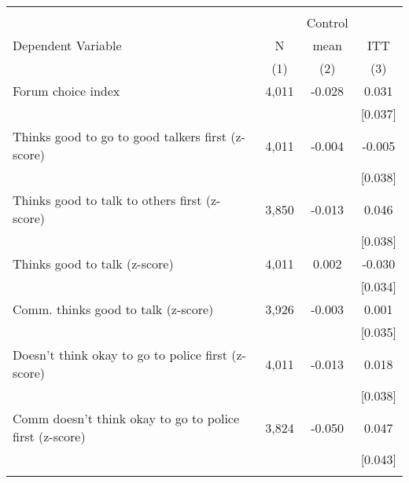 \begin{tabular}{lccc}
\hline \noalign{\smallskip} &  &  & \\
 &  & Control & \\
Dependent Variable & N & mean & ITT\\
 & (1) & (2) & (3)\\
\noalign{\smallskip}\hline \noalign{\smallskip}Forum choice index & 4,011 & -0.028 & 0.031\\
 &  &  & [0.037]\\
\quad Thinks good to go to good talkers first (z-score) & 4,011 & -0.004 & -0.005\\
 &  &  & [0.038]\\
\quad Thinks good to talk to others first (z-score) & 3,850 & -0.013 & 0.046\\
 &  &  & [0.038]\\
\quad Thinks good to talk (z-score) & 4,011 & 0.002 & -0.030\\
 &  &  & [0.034]\\
\quad Comm. thinks good to talk (z-score) & 3,926 & -0.003 & 0.001\\
 &  &  & [0.035]\\
\quad Doesn't think okay to go to police first (z-score) & 4,011 & -0.013 & 0.018\\
 &  &  & [0.038]\\
\quad Comm doesn't think okay to go to police first (z-score) & 3,824 & -0.050 & 0.047\\
 &  &  & [0.043]\\
\noalign{\smallskip}\hline\end{tabular}
